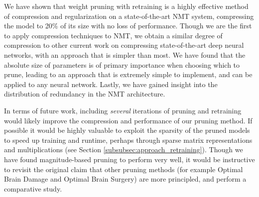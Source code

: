 We have shown that weight pruning with retraining is a highly effective method of compression and regularization on a state-of-the-art NMT system, compressing the model to 20\% of its size with no loss of performance. 
Though we are the first to apply compression techniques to NMT, we obtain a similar degree of compression to other current work on compressing state-of-the-art deep neural networks, with an approach that is simpler than most.
We have found that the absolute size of parameters is of primary importance when choosing which to prune, leading to an approach that is extremely simple to implement, and can be applied to any neural network.
Lastly, we have gained insight into the distribution of redundancy in the NMT architecture.

In terms of future work, including \emph{several} iterations of pruning and retraining would likely improve the compression and performance of our pruning method.
If possible it would be highly valuable to exploit the sparsity of the pruned
models to speed up training and runtime, perhaps through sparse matrix
representations and multiplications (see Section \ref{subsubsec:approach_retraining}).
Though we have found magnitude-based pruning to perform very well, it would be instructive to revisit the original claim that other pruning methods (for example Optimal Brain Damage and Optimal Brain Surgery) are more principled, and perform a comparative study.



